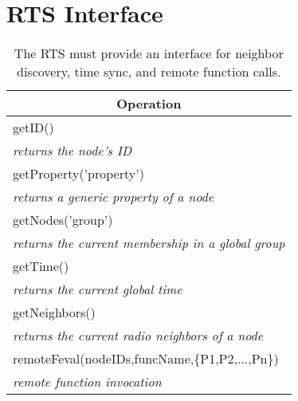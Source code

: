 \chapter{RTS Interface}
\label{appendix:e}

\begin{table}
  \centering
   \begin{tabular}{| l |}
     \hline
     \multicolumn{1}{|c|}{Operation} \\
     \hline
     getID() \\
     \textit{returns the node's ID}\\
     \hline
     getProperty('property') \\
     \textit{returns a generic property of a node} \\
     \hline
     getNodes('group') \\
     \textit{returns the current membership in a global group}\\
     \hline
     getTime() \\
     \textit{returns the current global time} \\
     \hline
     getNeighbors() \\
     \textit{returns the current radio neighbors of a node}\\
     \hline
     remoteFeval(nodeIDs,funcName,\{P1,P2,...,Pn\}) \\
     \textit{remote function invocation}\\
     \hline
   \end{tabular}
   \caption[Functions supported by the Run-Time System]{The RTS must provide an interface for
   neighbor discovery, time sync, and remote function calls.}
   \label{table:lib}
\end{table}
